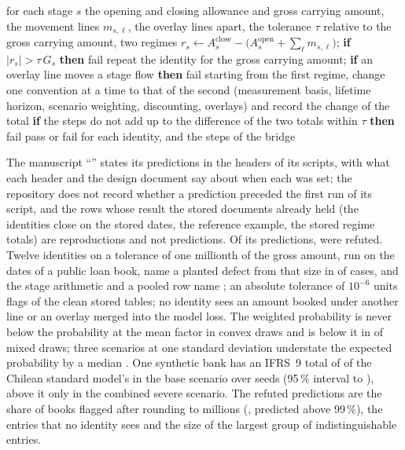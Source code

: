 \begin{algorithm}[htbp]
\caption{Roll-forward gate of the allowance and bridge between two regimes.}
\label{alg:bs5}
\begin{algorithmic}[1]
\Require for each stage $s$ the opening and closing allowance and gross carrying amount, the movement lines $m_{s,\ell}$, the overlay lines apart, the tolerance $\tau$ relative to the gross carrying amount, two regimes
  \State $r_{s}\gets A^{\mathrm{close}}_{s}-\big(A^{\mathrm{open}}_{s}+\sum_{\ell}m_{s,\ell}\big)$; \quad \textbf{if} $|r_{s}|>\tau\,G_{s}$ \textbf{then} fail
\EndFor
\State repeat the identity for the gross carrying amount; \textbf{if} an overlay line moves a stage flow \textbf{then} fail
\State starting from the first regime, change one convention at a time to that of the second (measurement basis, lifetime horizon, scenario weighting, discounting, overlays) and record the change of the total
\State \textbf{if} the steps do not add up to the difference of the two totals within $\tau$ \textbf{then} fail
\State \Return pass or fail for each identity, and the steps of the bridge
\end{algorithmic}
\end{algorithm}

The manuscript ``\pxPaperTitleFive{}'' states its predictions in the headers of its scripts, with what each header and the design document say about when each was set;
the repository does not record whether a prediction preceded the first run of its script, and the rows whose result the stored documents already held (the identities close on the stored
dates, the reference example, the stored regime totals) are reproductions and not predictions. Of its \pxPpFiveHypTotal{} predictions, \pxPpFiveHypRefuted{} were refuted. Twelve identities on a tolerance of one
millionth of the gross amount, run on the dates of a public loan book, name a planted defect from that size in \pxPpFiveAboveFullK{} of \pxPpFiveAboveFullN{} cases, and the stage arithmetic and a
pooled row name \pxPpFiveAboveStageK{}; an absolute tolerance of $10^{-6}$ units flags \pxPpFiveAbsCommittedK{} of the clean stored tables; no identity sees an amount booked under another line or an
overlay merged into the model loss. The weighted probability is never below the probability at the mean factor in \pxPpFiveConvexN{} convex draws and is below it in \pxPpFiveMixedNeg{} of
\pxPpFiveMixedN{} mixed draws; three scenarios at one standard deviation understate the expected probability by a median \pxPpFiveAdhocMed{}. One synthetic bank has an IFRS~9 total of
\pxPpFiveBaseMean{} of the Chilean standard model's in the base scenario over \pxPpFiveSeeds{} seeds (95\,\% interval \pxPpFiveBaseLo{} to \pxPpFiveBaseHi{}), above it only in the combined severe
scenario. The refuted predictions are the share of books flagged after rounding to millions (\pxPpFiveRoundMillion{}, predicted above 99\,\%), the entries that no identity sees and the size of
the largest group of indistinguishable entries.

